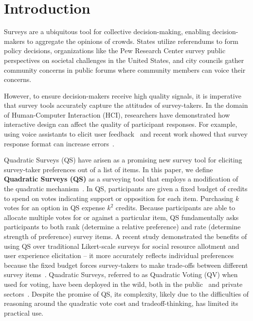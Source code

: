 \section{Introduction}

Surveys are a ubiquitous tool for collective decision-making, enabling decision-makers to aggregate the opinions of crowds. States utilize referendums to form policy decisions, organizations like the Pew Research Center survey public perspectives on societal challenges in the United States, and city councils gather community concerns in public forums where community members can voice their concerns.

However, to ensure decision-makers receive high quality signals, it is imperative that survey tools accurately capture the attitudes of survey-takers. In the domain of Human-Computer Interaction (HCI), researchers have demonstrated how interactive design can affect the quality of participant responses. For example, using voice assistants to elicit user feedback~\cite{xiaoLetMeAsk2021} and recent work showed that survey response format can increase errors~\cite{pielotDidYouMisclick2024}.

Quadratic Surveys (QS) have arisen as a promising new survey tool for eliciting survey-taker preferences out of a list of items. In this paper, we define \textbf{Quadratic Surveys (QS)} as a surveying tool that employs a modification of the quadratic mechanism~\cite{grovesOptimalAllocationPublic1977}. In QS, participants are given a fixed budget of credits to spend on votes indicating support or opposition for each item. Purchasing $k$ votes for an option in QS expense $k^2$ credits. Because participants are able to allocate multiple votes for or against a particular item, QS fundamentally asks participants to both rank (determine a relative preference) and rate (determine strength of preference) survey items. A recent study demonstrated the benefits of using QS over traditional Likert-scale surveys for social resource allotment and user experience elicitation -- it more accurately reflects individual preferences because the fixed budget forces survey-takers to make trade-offs between different survey items~\cite{chengCanShowWhat2021}. Quadratic Surveys, referred to as Quadratic Voting (QV) when used for voting, have been deployed in the wild, both in the public~\cite{rogersColoradoTriedNew2019, teamTaiwanDigitalMinister} and private sectors~\cite{Gov4gitDecentralizedPlatform2023}. Despite the promise of QS, its complexity, likely due to the difficulties of reasoning around the quadratic vote cost and tradeoff-thinking, has limited its practical use.

